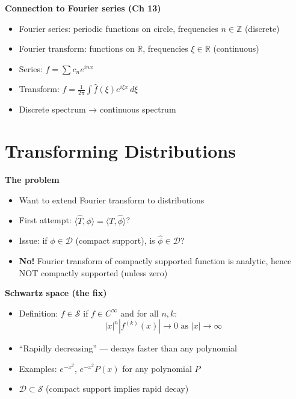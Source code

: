 \documentclass[
  10pt,
  letterpaper,
]{scrbook}
\providecommand{\tightlist}{%
  \setlength{\itemsep}{0pt}\setlength{\parskip}{0pt}}
\begin{document}
\textbf{Connection to Fourier series (Ch 13)}

\begin{itemize}
\tightlist
\item
  Fourier series: periodic functions on circle, frequencies
  \(n \in \mathbb{Z}\) (discrete)
\item
  Fourier transform: functions on \(\mathbb{R}\), frequencies
  \(\xi \in \mathbb{R}\) (continuous)
\item
  Series: \(f = \sum c_n e^{inx}\)
\item
  Transform: \(f = \frac{1}{2\pi}\int \hat{f}(\xi) e^{i\xi x}\, d\xi\)
\item
  Discrete spectrum → continuous spectrum
\end{itemize}

\section{Transforming Distributions}\label{transforming-distributions}

\textbf{The problem}

\begin{itemize}
\tightlist
\item
  Want to extend Fourier transform to distributions
\item
  First attempt:
  \(\langle \hat{T}, \phi \rangle = \langle T, \hat{\phi} \rangle\)?
\item
  Issue: if \(\phi \in \mathcal{D}\) (compact support), is
  \(\hat{\phi} \in \mathcal{D}\)?
\item
  \textbf{No!} Fourier transform of compactly supported function is
  analytic, hence NOT compactly supported (unless zero)
\end{itemize}

\textbf{Schwartz space (the fix)}

\begin{itemize}
\tightlist
\item
  Definition: \(f \in \mathcal{S}\) if \(f \in C^\infty\) and for all
  \(n, k\): \[|x|^n |f^{(k)}(x)| \to 0 \text{ as } |x| \to \infty\]
\item
  ``Rapidly decreasing'' --- decays faster than any polynomial
\item
  Examples: \(e^{-x^2}\), \(e^{-x^2}P(x)\) for any polynomial \(P\)
\item
  \(\mathcal{D} \subset \mathcal{S}\) (compact support implies rapid
  decay)
\end{itemize}
\end{document}
